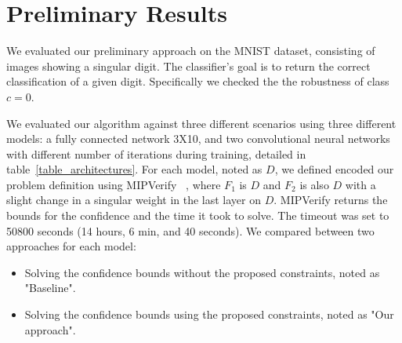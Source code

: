 
\section{Preliminary Results}
We evaluated our preliminary approach on the MNIST dataset, consisting of images showing a singular digit.
The classifier's goal is to return the correct classification of a given digit. Specifically we checked the the robustness of class $c=0$.

We evaluated our algorithm against three different scenarios using three different models: a fully connected network 3X10, and two convolutional neural networks with different number of iterations during training, detailed in table~\ref{table_architectures}. For each model, noted as $D$, we defined encoded our problem definition using MIPVerify ~\cite{MIPVERIFY}, where $F_1$ is $D$ and $F_2$ is also $D$ with a slight change in a singular weight in the last layer on $D$. MIPVerify returns the bounds for the confidence and the time it took to solve. The timeout was set to 50800 seconds (14 hours, 6 min, and 40 seconds). We compared between two approaches for each model:
\begin{itemize}
    \item Solving the confidence bounds without the proposed constraints, noted as "Baseline".
    \item Solving the confidence bounds using the proposed constraints, noted as "Our approach".
\end{itemize}

\begin{table}[H]
    \centering
    \caption{The networks used for this experience.
        \label{table_architectures}}
\end{table}

